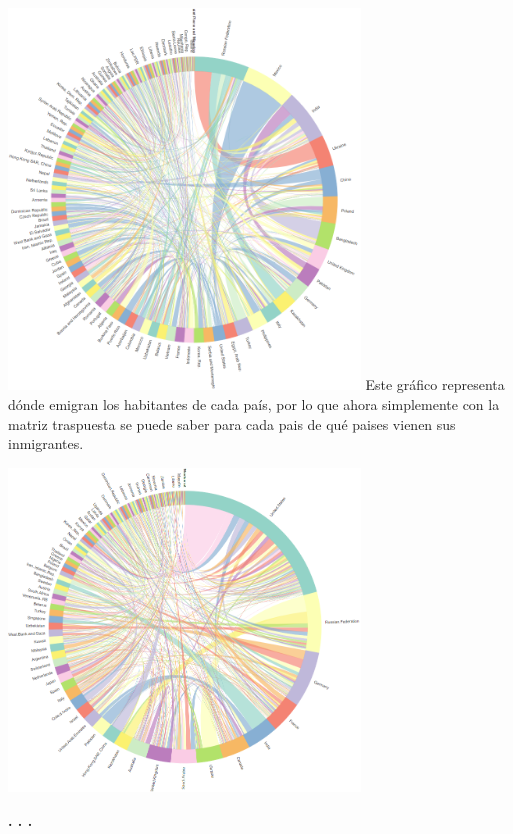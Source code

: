 \documentclass{article}\usepackage[]{graphicx}\usepackage[]{color}
\begin{document}
\vbox{
    \centering
    \includegraphics[width=0.7\textwidth]{imag/cuerdasmigra_inte}
}
\clearpage
Este gr\'afico representa d\'onde emigran los habitantes de cada pa\'is, por lo que ahora simplemente con la matriz traspuesta se puede saber para cada pais de qu\'e paises vienen sus inmigrantes.

\vbox{
    \centering
    \includegraphics[width=0.7\textwidth]{imag/cuerdasmigratra_inte}
}
~\\
\begin{center}
\textbf{. . .}
\end{center}
\end{document}

